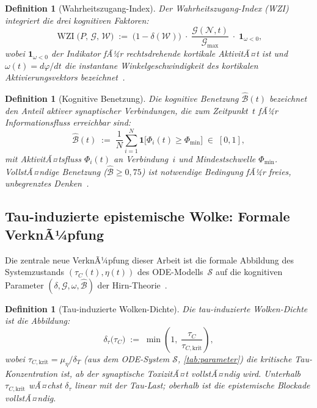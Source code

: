 ﻿\documentclass[12pt,a4paper]{article}
\newtheorem{definition}[theorem]{Definition}
\theoremstyle{definition}
\DeclareMathOperator{\WZI}{WZI}
\begin{document}
	\begin{definition}[Wahrheitszugang-Index]
		\label{def:wzi_tany}
		Der \emph{Wahrheitszugang-Index} (WZI) integriert die drei kognitiven Faktoren:
		\[
			\WZI\bigl(P,\,\mathcal{G},\,\mathcal{W}\bigr)
			\;:=\;
			\bigl(1 - \delta(\mathcal{W})\bigr)
			\;\cdot\;
			\frac{\mathcal{G}(\mathcal{N},t)}{\mathcal{G}_{\max}}
			\;\cdot\;
			\mathbf{1}_{\omega < 0},
		\]
		wobei $\mathbf{1}_{\omega < 0}$ der Indikator fÃ¼r rechtsdrehende kortikale
		AktivitÃ¤t ist und $\omega(t) = d\varphi/dt$ die instantane Winkelgeschwindigkeit
		des kortikalen Aktivierungsvektors bezeichnet~\cite{Epp2026brn}.
	\end{definition}

	\begin{definition}[Kognitive Benetzung]
		\label{def:kognbenet}
		Die \emph{kognitive Benetzung} $\hat{\mathcal{B}}(t)$ bezeichnet den Anteil
		aktiver synaptischer Verbindungen, die zum Zeitpunkt~$t$ fÃ¼r Informationsfluss
		erreichbar sind:
		\[
			\hat{\mathcal{B}}(t) \;:=\; \frac{1}{N} \sum_{i=1}^N
			\mathbf{1}\bigl[\Phi_i(t) \geq \Phi_{\min}\bigr] \;\in\; [0,1],
		\]
		mit AktivitÃ¤tsfluss $\Phi_i(t)$ an Verbindung~$i$ und Mindestschwelle $\Phi_{\min}$.
		VollstÃ¤ndige Benetzung ($\hat{\mathcal{B}} \geq 0{,}75$) ist notwendige Bedingung
		fÃ¼r freies, unbegrenztes Denken~\cite{Epp2026brn}.
	\end{definition}

	\subsection{Tau-induzierte epistemische Wolke: Formale VerknÃ¼pfung}

	Die zentrale neue VerknÃ¼pfung dieser Arbeit ist die formale Abbildung des
	Systemzustands $(\tau_C(t), \eta(t))$ des ODE-Modells~$\mathcal{S}$ auf die kognitiven
	Parameter $(\delta, \mathcal{G}, \omega, \hat{\mathcal{B}})$ der Hirn-Theorie~\cite{Epp2026brn}.

	\begin{definition}[Tau-induzierte Wolken-Dichte]
		\label{def:taucloud}
		Die \emph{tau-induzierte Wolken-Dichte} ist die Abbildung:
		\[
			\delta_\tau\bigl(\tau_C\bigr)
			\;:=\; \min\!\left(1,\;\frac{\tau_C}{\tau_{C,\mathrm{krit}}}\right),
		\]
		wobei $\tau_{C,\mathrm{krit}} = \mu_\eta / \delta_T$ (aus dem ODE-System $\mathcal{S}$,
		\cref{tab:parameter}) die kritische Tau-Konzentration ist, ab der synaptische
		ToxizitÃ¤t vollstÃ¤ndig wird. Unterhalb $\tau_{C,\mathrm{krit}}$ wÃ¤chst $\delta_\tau$
		linear mit der Tau-Last; oberhalb ist die epistemische Blockade vollstÃ¤ndig.
	\end{definition}
\end{document}

